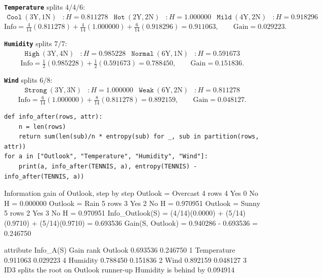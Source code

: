 \documentclass[11pt]{article}
\begin{document}
\begin{worked}
\textbf{\texttt{Temperature}} splits $4/4/6$:
\begin{align*}
  \texttt{Cool}\ (3\text{Y},1\text{N})&: H = 0.811278 &
  \texttt{Hot}\ (2\text{Y},2\text{N})&: H = 1.000000 &
  \texttt{Mild}\ (4\text{Y},2\text{N})&: H = 0.918296
\end{align*}
\[
  \mathrm{Info} = \tfrac{4}{14}(0.811278) + \tfrac{4}{14}(1.000000)
                + \tfrac{6}{14}(0.918296) = 0.911063,
  \qquad \mathrm{Gain} = \mathbf{0.029223}.
\]

\textbf{\texttt{Humidity}} splits $7/7$:
\begin{align*}
  \texttt{High}\ (3\text{Y},4\text{N})&: H = 0.985228 &
  \texttt{Normal}\ (6\text{Y},1\text{N})&: H = 0.591673
\end{align*}
\[
  \mathrm{Info} = \tfrac12(0.985228) + \tfrac12(0.591673) = 0.788450,
  \qquad \mathrm{Gain} = \mathbf{0.151836}.
\]

\textbf{\texttt{Wind}} splits $6/8$:
\begin{align*}
  \texttt{Strong}\ (3\text{Y},3\text{N})&: H = 1.000000 &
  \texttt{Weak}\ (6\text{Y},2\text{N})&: H = 0.811278
\end{align*}
\[
  \mathrm{Info} = \tfrac{6}{14}(1.000000) + \tfrac{8}{14}(0.811278)
                 = 0.892159,
  \qquad \mathrm{Gain} = \mathbf{0.048127}.
\]
\end{worked}

\begin{lstlisting}
def info_after(rows, attr):
    n = len(rows)
    return sum(len(sub)/n * entropy(sub) for _, sub in partition(rows, attr))
for a in ["Outlook", "Temperature", "Humidity", "Wind"]:
    print(a, info_after(TENNIS, a), entropy(TENNIS) - info_after(TENNIS, a))
\end{lstlisting}
\begin{codeout}
Information gain of Outlook, step by step
   Outlook = Overcast    4 rows  4 Yes 0 No   H = 0.000000
   Outlook = Rain        5 rows  3 Yes 2 No   H = 0.970951
   Outlook = Sunny       5 rows  2 Yes 3 No   H = 0.970951
   Info_Outlook(S) = (4/14)(0.0000) + (5/14)(0.9710) + (5/14)(0.9710)
                   = 0.693536
   Gain(S, Outlook) = 0.940286 - 0.693536 = 0.246750
\end{codeout}
\begin{codeout}
attribute      Info_A(S)     Gain     rank
Outlook        0.693536   0.246750   1
Temperature    0.911063   0.029223   4
Humidity       0.788450   0.151836   2
Wind           0.892159   0.048127   3
ID3 splits the root on Outlook
runner-up Humidity is behind by 0.094914
\end{codeout}
\end{document}
